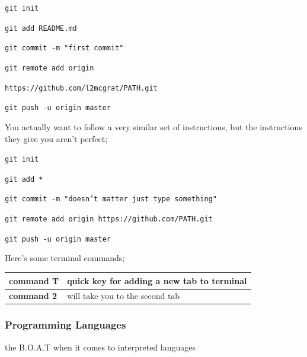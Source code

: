 \documentclass{article}
\newcounter{subsubsubsection}[subsubsection]
\begin{document}
\texttt{git init}

\texttt{git add README.md}

\texttt{git commit -m "first commit"}

\texttt{git remote add origin}

\texttt{https://github.com/l2mcgrat/PATH.git}

\texttt{git push -u origin master}

You actually want to follow a very similar set of instructions, but the instructions they give you aren't perfect;

\texttt{git init}

\texttt{git add *}

\texttt{git commit -m "doesn't matter just type something"}

\texttt{git remote add origin https://github.com/PATH.git}

\texttt{git push -u origin master}

Here's some terminal commands;

\begin{center}
\begin{tabular*}{\textwidth}{ | p{} | p{}| }
\hline
\textbf{command T} & quick key for adding a new tab to terminal \\
\hline
\textbf{command 2} & will take you to the second tab \\
\hline
\end{tabular*}
\end{center}

\subsubsection{Programming Languages}\label{sec:programming-languages}

the B.O.A.T when it comes to interpreted languages 
\end{document}
